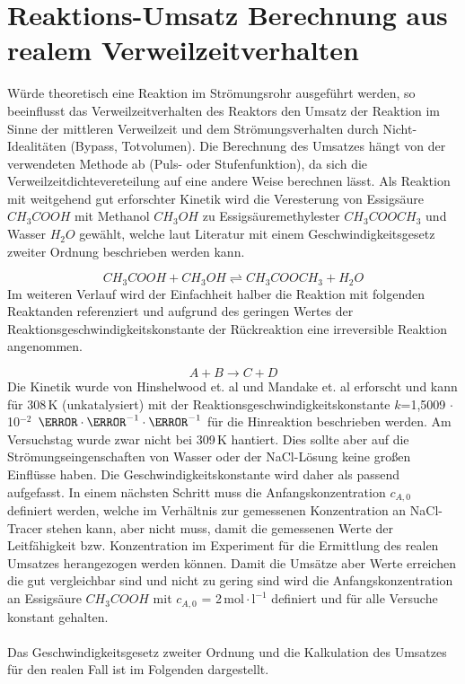 \documentclass[12pt,liststotoc]{report}
\begin{document}
\newpage

\section{Reaktions-Umsatz Berechnung aus realem Verweilzeitverhalten}
\label{sec:umsatz}

Würde theoretisch eine Reaktion im Strömungsrohr ausgeführt werden, so beeinflusst das Verweilzeitverhalten des Reaktors den Umsatz der Reaktion im Sinne der mittleren Verweilzeit und dem  Strömungsverhalten durch Nicht-Idealitäten (Bypass, Totvolumen). Die Berechnung des Umsatzes hängt von der verwendeten Methode ab (Puls- oder Stufenfunktion), da sich die Verweilzeitdichtevereteilung auf eine andere Weise berechnen lässt. Als Reaktion mit weitgehend gut erforschter Kinetik wird die Veresterung von Essigsäure $CH_3COOH$ mit Methanol $CH_3OH$ zu Essigsäuremethylester $CH_3COOCH_3$ und Wasser $H_2O$ gewählt, welche laut Literatur \cite{Rolfe1934, mandake2013kinetic} mit einem Geschwindigkeitsgesetz zweiter Ordnung beschrieben werden kann.

\begin{equation*}
 CH_3COOH + CH_3OH \rightleftharpoons CH_3COOCH_3 + H_2O 
\end{equation*}
\noindent
Im weiteren Verlauf wird der Einfachheit halber die Reaktion mit folgenden Reaktanden referenziert und aufgrund des geringen Wertes der Reaktionsgeschwindigkeitskonstante der Rückreaktion eine irreversible Reaktion angenommen.

\begin{equation*}
    A + B \rightarrow C + D
\end{equation*}
\noindent
Die Kinetik wurde von Hinshelwood et. al und Mandake et. al \cite{Rolfe1934, mandake2013kinetic} erforscht und kann für 308\,K (unkatalysiert) mit der Reaktionsgeschwindigkeitskonstante $k$=1,5009 $\cdot  $10$^{-2}$\, $\litre\cdot\mole^{-1}\cdot\s^{-1}$ für die Hinreaktion beschrieben werden. Am Versuchstag wurde zwar nicht bei 309\,K hantiert. Dies sollte aber auf die Strömungseingenschaften von Wasser oder der NaCl-Lösung keine großen Einflüsse haben. Die Geschwindigkeitskonstante wird daher als passend aufgefasst. In einem nächsten Schritt muss die Anfangskonzentration $c_{A,0}$ definiert werden, welche im Verhältnis zur gemessenen Konzentration an NaCl-Tracer stehen kann, aber nicht muss, damit die gemessenen Werte der Leitfähigkeit bzw. Konzentration im Experiment für die Ermittlung des realen Umsatzes herangezogen werden können. Damit die Umsätze aber Werte erreichen die gut vergleichbar sind und nicht zu gering sind wird die Anfangskonzentration an Essigsäure $CH_3COOH$ mit $c_{A,0}$ = 2\,$\text{mol}\cdot\text{l}^{-1}$ definiert und für alle Versuche konstant gehalten. 
\\
\\
Das Geschwindigkeitsgesetz zweiter Ordnung und die Kalkulation des Umsatzes für den realen Fall ist im Folgenden dargestellt.
\end{document}
